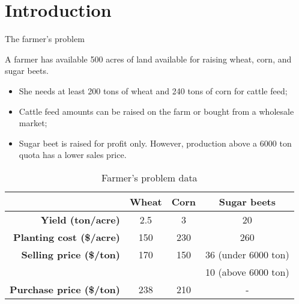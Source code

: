 \section{Introduction}

\begin{frame}{The farmer's problem {\small \cite{birge2011introduction}}}
	
	A farmer has available \alert{500 acres} of land available for raising wheat, corn, and sugar beets. 
	\begin{itemize}
		\item She needs at least \alert{200 tons of wheat} and \alert{240 tons of corn} for cattle feed;
		\item Cattle feed amounts can be \alert{raised} on the farm or \alert{bought} from a wholesale market;
		\item Sugar beet is raised for profit only. However, production above a \alert{6000 ton quota} has a lower sales price. 
	\end{itemize}	
	\pause
	\vspace{-6pt}
	{\small
	\begin{table}
		\begin{tabular}{r|ccc}
			& \bf Wheat & \bf Corn & \bf Sugar beets \\ \hline
			\bf Yield (ton/acre) & 2.5 & 3 & 20 \\
			\bf Planting cost (\$/acre) & 150 & 230 & 260 \\
			\bf Selling price (\$/ton) & 170 & 150  & 36 (under 6000 ton) \\
								   & 	 &	    & 10 (above 6000 ton) \\
			\bf Purchase price (\$/ton)& 238 & 210  & - \\ \hline					    
		\end{tabular}
		\caption{Farmer's problem data}		
	\end{table}
	}
	
\end{frame}


